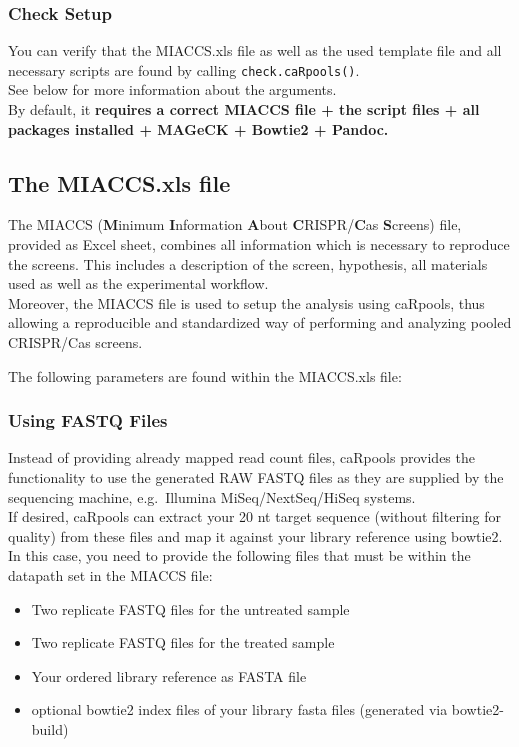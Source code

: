 \documentclass[]{article}
\providecommand{\tightlist}{%
  \setlength{\itemsep}{0pt}\setlength{\parskip}{0pt}}
\begin{document}
\subsubsection{Check Setup}\label{check-setup}

You can verify that the MIACCS.xls file as well as the used template
file and all necessary scripts are found by calling
\texttt{check.caRpools()}.\\
See below for more information about the arguments.\\
By default, it \textbf{requires a correct MIACCS file + the script files
+ all packages installed + MAGeCK + Bowtie2 + Pandoc.}

\subsection{The MIACCS.xls file}\label{the-miaccs.xls-file}

The MIACCS (\textbf{M}inimum \textbf{I}nformation \textbf{A}bout
\textbf{C}RISPR/\textbf{C}as \textbf{S}creens) file, provided as Excel
sheet, combines all information which is necessary to reproduce the
screens. This includes a description of the screen, hypothesis, all
materials used as well as the experimental workflow.\\
Moreover, the MIACCS file is used to setup the analysis using caRpools,
thus allowing a reproducible and standardized way of performing and
analyzing pooled CRISPR/Cas screens.

The following parameters are found within the MIACCS.xls file:

\subsubsection{Using FASTQ Files}\label{using-fastq-files}

Instead of providing already mapped read count files, caRpools provides
the functionality to use the generated RAW FASTQ files as they are
supplied by the sequencing machine, e.g.~Illumina MiSeq/NextSeq/HiSeq
systems.\\
If desired, caRpools can extract your 20 nt target sequence (without
filtering for quality) from these files and map it against your library
reference using bowtie2. In this case, you need to provide the following
files that must be within the datapath set in the MIACCS file:

\begin{itemize}
\tightlist
\item
  Two replicate FASTQ files for the untreated sample
\item
  Two replicate FASTQ files for the treated sample
\item
  Your ordered library reference as FASTA file
\item
  optional bowtie2 index files of your library fasta files (generated
  via bowtie2-build)
\end{itemize}
\end{document}
